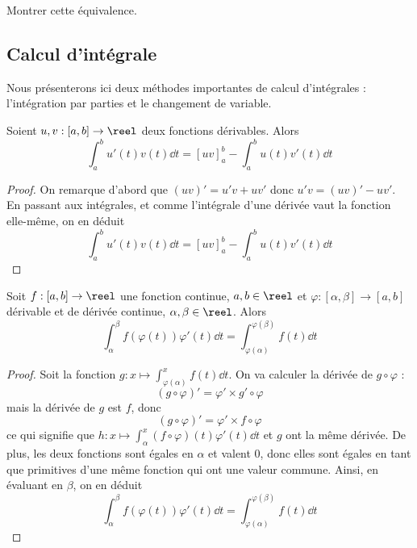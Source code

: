 \begin{exo}
    Montrer cette équivalence.
\end{exo}

\subsection{Calcul d'intégrale}

Nous présenterons ici deux méthodes importantes de calcul d'intégrales : l'intégration par parties et le changement de variable.

\begin{prop}
    Soient $u,v : [a,b]\to\reel$ deux fonctions dérivables. Alors $$\int_a^b u'(t)v(t)\dd t = [uv]_a^b - \int_a^b u(t)v'(t)\dd t$$
\end{prop}

\begin{proof}
    On remarque d'abord que $(uv)' = u'v+uv'$ donc $u'v = (uv)'-uv'$. En passant aux intégrales, et comme l'intégrale d'une dérivée vaut la fonction elle-même, on en déduit $$\boxed{\int_a^b u'(t)v(t)\dd t = [uv]_a^b - \int_a^b u(t)v'(t)\dd t}$$
\end{proof}

\begin{prop}
    Soit $f : [a,b]\to\reel$ une fonction continue, $a,b\in\reel$ et $\varphi : [\alpha,\beta]\to [a,b]$ dérivable et de dérivée continue, $\alpha,\beta\in\reel$. Alors $$\int_\alpha^\beta f(\varphi(t))\varphi'(t)\dd t = \int_{\varphi(\alpha)}^{\varphi(\beta)} f(t)\dd t$$
\end{prop}

\begin{proof}
    Soit la fonction $g : x\longmapsto \displaystyle\int_{\varphi(\alpha)}^x f(t)\dd t$. On va calculer la dérivée de $g\circ\varphi$ : $$(g\circ\varphi)' = \varphi'\times g'\circ\varphi$$ mais la dérivée de $g$ est $f$, donc $$(g\circ \varphi)' = \varphi'\times f\circ\varphi$$ ce qui signifie que $h : x\longmapsto \displaystyle\int_{\alpha}^x (f\circ\varphi)(t)\varphi'(t)\dd t$ et $g$ ont la même dérivée. De plus, les deux fonctions sont égales en $\alpha$ et valent $0$, donc elles sont égales en tant que primitives d'une même fonction qui ont une valeur commune. Ainsi, en évaluant en $\beta$, on en déduit $$\boxed{\int_\alpha^\beta f(\varphi(t))\varphi'(t)\dd t = \int_{\varphi(\alpha)}^{\varphi(\beta)}f(t)\dd t}$$
\end{proof}

\newpage